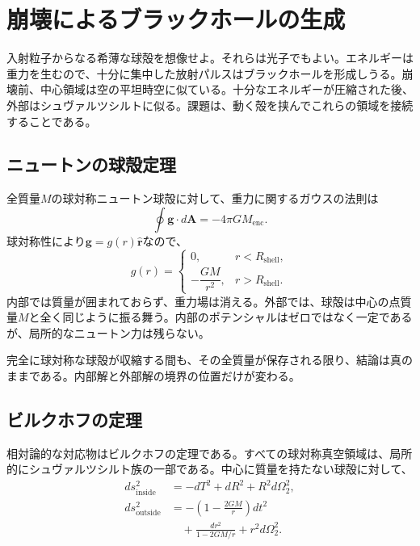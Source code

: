 \section{崩壊によるブラックホールの生成}

入射粒子からなる希薄な球殻を想像せよ。それらは光子でもよい。エネルギーは重力を生むので、十分に集中した放射パルスはブラックホールを形成しうる。崩壊前、中心領域は空の平坦時空に似ている。十分なエネルギーが圧縮された後、外部はシュヴァルツシルトに似る。課題は、動く殻を挟んでこれらの領域を接続することである。

\subsection{ニュートンの球殻定理}

全質量\(M\)の球対称ニュートン球殻に対して、重力に関するガウスの法則は
\begin{equation}
\oint \mathbf{g}\cdot d\mathbf{A}=-4\pi G M_{\mathrm{enc}}.
\label{eq:l04-gauss-gravity}
\end{equation}
球対称性により\(\mathbf{g}=g(r)\hat{\mathbf r}\)なので、
\begin{equation}
g(r)=
\begin{cases}
0, & r<R_{\mathrm{shell}},\\[4pt]
-\dfrac{GM}{r^2}, & r>R_{\mathrm{shell}}.
\end{cases}
\label{eq:l04-shell-field}
\end{equation}
内部では質量が囲まれておらず、重力場は消える。外部では、球殻は中心の点質量\(M\)と全く同じように振る舞う。内部のポテンシャルはゼロではなく一定であるが、局所的なニュートン力は残らない。

完全に球対称な球殻が収縮する間も、その全質量が保存される限り、結論は真のままである。内部解と外部解の境界の位置だけが変わる。

\subsection{ビルクホフの定理}

相対論的な対応物はビルクホフの定理である。すべての球対称真空領域は、局所的にシュヴァルツシルト族の一部である。中心に質量を持たない球殻に対して、
\begin{align}
ds^2_{\mathrm{inside}}&=-dT^2+dR^2+R^2d\Omega_2^2,\\
ds^2_{\mathrm{outside}}&=
-\left(1-\frac{2GM}{r}\right)dt^2
\nonumber\\
&\quad+\frac{dr^2}{1-2GM/r}
+r^2d\Omega_2^2.
\label{eq:l04-birkhoff-pieces}
\end{align}

